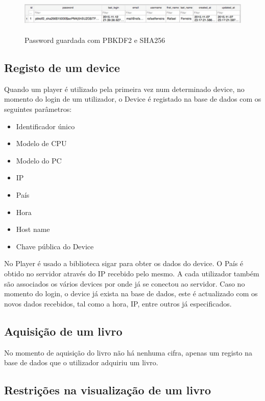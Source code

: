 \documentclass[pdftex,12pt,a4paper]{report}
\begin{document}
\begin{figure}[!htb]
\center
 \includegraphics[width=150mm,scale=1]{pbkdf2_saved.pdf}
 \caption{\\Password guardada com PBKDF2 e SHA256}
 \label{fig:eer}
\end{figure}

\subsection{Registo de um device}
Quando um player é utilizado pela primeira vez num determinado device, no momento do login de um utilizador, o Device é registado na base de dados com os seguintes parâmetros:

\begin{itemize}
\item Identificador único
\item Modelo de CPU
\item Modelo do PC
\item IP
\item País
\item Hora
\item Host name
\item Chave pública do Device
\end{itemize}

	No Player é usado a biblioteca sigar para obter os dados do device. O País é obtido no servidor através do IP recebido pelo mesmo.
	A cada utilizador também são associados os vários devices por onde já se conectou ao servidor.
	Caso no momento do login, o device já exista na base de dados, este é actualizado com os novos dados recebidos, tal como a hora, IP, entre outros já especificados.

\subsection{Aquisição de um livro}

No momento de aquisição do livro não há nenhuma cifra, apenas um registo na base de dados que o utilizador adquiriu um livro.

\subsection{Restrições na visualização de um livro}
\end{document}
